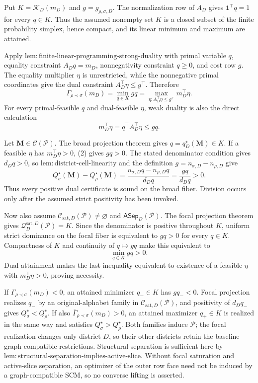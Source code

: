 Put \(K=\mathcal K_D(m_D)\) and \(g=g_{\rho,\sigma,D}\).  The normalization row of \(A_D\) gives \(\mathbf 1^\top q=1\) for every \(q\in K\).  Thus the assumed nonempty set \(K\) is a closed subset of the finite probability simplex, hence compact, and its linear minimum and maximum are attained.

Apply \(\mathrm{lem:finite\text{-}linear\text{-}programming\text{-}strong\text{-}duality}\) with primal variable \(q\), equality constraint \(A_Dq=m_D\), nonnegativity constraint \(q\geq0\), and cost row \(g\).  The equality multiplier \(\eta\) is unrestricted, while the nonnegative primal coordinates give the dual constraint \(A_D^\top\eta\leq g^\top\).  Therefore
\[
\Gamma_{\rho\prec\sigma}(m_D)
=\min_{q\in K}gq
=\max_{\eta:A_D^\top\eta\leq g^\top}m_D^\top\eta.
\]
For every primal-feasible \(q\) and dual-feasible \(\eta\), weak duality is also the direct calculation
\[
m_D^\top\eta
=q^\top A_D^\top\eta
\leq gq.
\tag{2}
\]

Let \(\mathbf M\in\mathcal C(\mathcal P)\).  The broad projection theorem gives \(q=q_D^\star(\mathbf M)\in K\).  If a feasible \(\eta\) has \(m_D^\top\eta>0\), (2) gives \(gq>0\).  The stated denominator condition gives \(d_Dq>0\), so \(\mathrm{lem:district\text{-}cell\text{-}linearity}\) and the definition \(g=n_{\sigma,D}-n_{\rho,D}\) give
\[
Q_\sigma^\star(\mathbf M)-Q_\rho^\star(\mathbf M)
=\frac{n_{\sigma,D}q-n_{\rho,D}q}{d_Dq}
=\frac{gq}{d_Dq}>0.
\]
Thus every positive dual certificate is sound on the broad fiber.  Division occurs only after the assumed strict positivity has been invoked.

Now also assume \(\mathcal C_{\mathrm{sat},D}(\mathcal P)\ne\varnothing\) and \(\mathsf{ASep}_D(\mathcal P)\).  The focal projection theorem gives \(\mathcal Q_D^{\mathrm{sat},D}(\mathcal P)=K\).  Since the denominator is positive throughout \(K\), uniform strict dominance on the focal fiber is equivalent to \(gq>0\) for every \(q\in K\).  Compactness of \(K\) and continuity of \(q\mapsto gq\) make this equivalent to
\[
\min_{q\in K}gq>0.
\]
Dual attainment makes the last inequality equivalent to existence of a feasible \(\eta\) with \(m_D^\top\eta>0\), proving necessity.

If \(\Gamma_{\rho\prec\sigma}(m_D)<0\), an attained minimizer \(q_-\in K\) has \(gq_-<0\).  Focal projection realizes \(q_-\) by an original-alphabet family in \(\mathcal C_{\mathrm{sat},D}(\mathcal P)\), and positivity of \(d_Dq_-\) gives \(Q_\sigma^\star<Q_\rho^\star\).  If also \(\overline\Gamma_{\rho\prec\sigma}(m_D)>0\), an attained maximizer \(q_+\in K\) is realized in the same way and satisfies \(Q_\sigma^\star>Q_\rho^\star\).  Both families induce \(\mathcal P\); the focal realization changes only district \(D\), so their other districts retain the baseline graph-compatible restrictions.  Structural separation is sufficient here by \(\mathrm{lem:structural\text{-}separation\text{-}implies\text{-}active\text{-}slice}\).  Without focal saturation and active-slice separation, an optimizer of the outer row face need not be induced by a graph-compatible SCM, so no converse lifting is asserted.